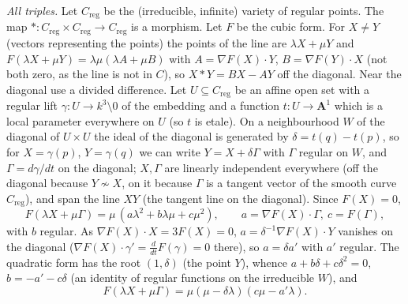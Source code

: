 \documentclass[11pt]{article}
\begin{document}
\emph{All triples.} Let $C_{\mathrm{reg}}$ be the (irreducible, infinite) variety of regular points. The map $*:C_{\mathrm{reg}}\times C_{\mathrm{reg}}\to C_{\mathrm{reg}}$ is a morphism. Let $F$ be the cubic form. For $X\ne Y$ (vectors representing the points) the points of the line are $\lambda X+\mu Y$ and $F(\lambda X+\mu Y)=\lambda\mu(\lambda A+\mu B)$ with $A=\nabla F(X)\cdot Y$, $B=\nabla F(Y)\cdot X$ (not both zero, as the line is not in $C$), so $X*Y=BX-AY$ off the diagonal. Near the diagonal use a divided difference. Let $U\subseteq C_{\mathrm{reg}}$ be an affine open set with a regular lift $\gamma:U\to k^3\setminus0$ of the embedding and a function $t:U\to\mathbf A^1$ which is a local parameter everywhere on $U$ (so $t$ is etale). On a neighbourhood $W$ of the diagonal of $U\times U$ the ideal of the diagonal is generated by $\delta=t(q)-t(p)$, so for $X=\gamma(p)$, $Y=\gamma(q)$ we can write $Y=X+\delta\Gamma$ with $\Gamma$ regular on $W$, and $\Gamma=d\gamma/dt$ on the diagonal; $X,\Gamma$ are linearly independent everywhere (off the diagonal because $Y\not\sim X$, on it because $\Gamma$ is a tangent vector of the smooth curve $C_{\mathrm{reg}}$), and span the line $XY$ (the tangent line on the diagonal). Since $F(X)=0$,
\[
F(\lambda X+\mu\Gamma)=\mu\,(a\lambda^2+b\lambda\mu+c\mu^2),\qquad a=\nabla F(X)\cdot\Gamma,\ c=F(\Gamma),
\]
with $b$ regular. As $\nabla F(X)\cdot X=3F(X)=0$, $a=\delta^{-1}\nabla F(X)\cdot Y$ vanishes on the diagonal ($\nabla F(X)\cdot\gamma'=\frac d{dt}F(\gamma)=0$ there), so $a=\delta a'$ with $a'$ regular. The quadratic form has the root $(1,\delta)$ (the point $Y$), whence $a+b\delta+c\delta^2=0$, $b=-a'-c\delta$ (an identity of regular functions on the irreducible $W$), and
\[
F(\lambda X+\mu\Gamma)=\mu(\mu-\delta\lambda)(c\mu-a'\lambda).
\]
\end{document}
